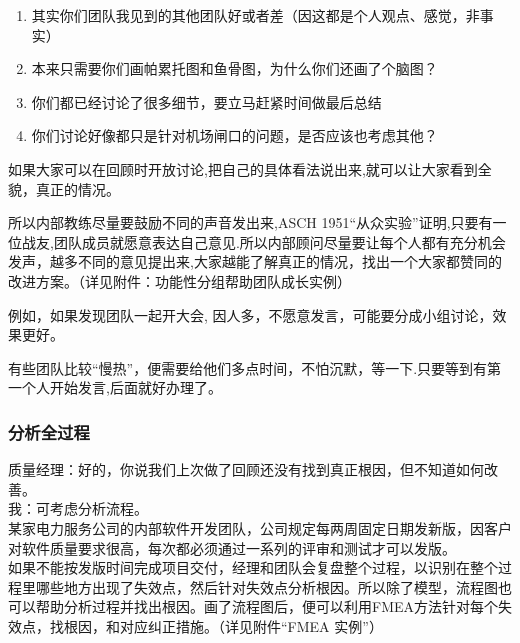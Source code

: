 \begin{enumerate}
\tightlist
\item
  其实你们团队我见到的其他团队好或者差（因这都是个人观点、感觉，非事实）
\item
  本来只需要你们画帕累托图和鱼骨图，为什么你们还画了个脑图？
\item
  你们都已经讨论了很多细节，要立马赶紧时间做最后总结
\item
  你们讨论好像都只是针对机场闸口的问题，是否应该也考虑其他？
\end{enumerate}



如果大家可以在回顾时开放讨论,把自己的具体看法说出来,就可以让大家看到全貌，真正的情况。

所以内部教练尽量要鼓励不同的声音发出来,ASCH
1951``从众实验''证明,只要有一位战友,团队成员就愿意表达自己意见.所以内部顾问尽量要让每个人都有充分机会发声，越多不同的意见提出来,大家越能了解真正的情况，找出一个大家都赞同的改进方案。（详见附件：功能性分组帮助团队成长实例）

例如，如果发现团队一起开大会,
因人多，不愿意发言，可能要分成小组讨论，效果更好。

有些团队比较``慢热''，便需要给他们多点时间，不怕沉默，等一下.只要等到有第一个人开始发言,后面就好办理了。

\hypertarget{ux5206ux6790ux5168ux8fc7ux7a0b}{%
\subsubsection{分析全过程}\label{ux5206ux6790ux5168ux8fc7ux7a0b}}

质量经理：好的，你说我们上次做了回顾还没有找到真正根因，但不知道如何改善。\\
我：可考虑分析流程。\\
某家电力服务公司的内部软件开发团队，公司规定每两周固定日期发新版，因客户对软件质量要求很高，每次都必须通过一系列的评审和测试才可以发版。\\
如果不能按发版时间完成项目交付，经理和团队会复盘整个过程，以识别在整个过程里哪些地方出现了失效点，然后针对失效点分析根因。所以除了模型，流程图也可以帮助分析过程并找出根因。画了流程图后，便可以利用FMEA方法针对每个失效点，找根因，和对应纠正措施。（详见附件``FMEA
实例''）

